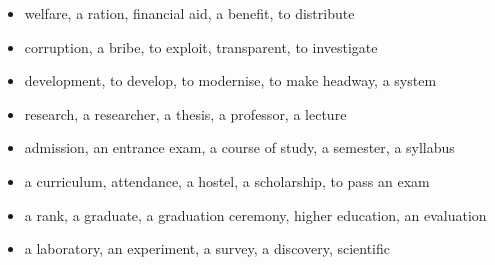 \begin{itemize}
\raggedright
  \item welfare, a ration, financial aid, a benefit, to distribute
  \item corruption, a bribe, to exploit, transparent, to investigate
  \item development, to develop, to modernise, to make headway, a system
  \item research, a researcher, a thesis, a professor, a lecture
  \item admission, an entrance exam, a course of study, a semester, a syllabus
  \item a curriculum, attendance, a hostel, a scholarship, to pass an exam
  \item a rank, a graduate, a graduation ceremony, higher education, an evaluation
  \item a laboratory, an experiment, a survey, a discovery, scientific
\end{itemize}

